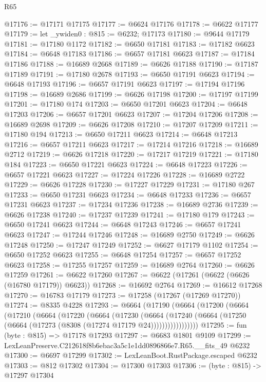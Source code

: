 \begin{lexlean}{R65}
\begin{coremodule}
{@17176 := @17171 @17175
@17177 := @6624 @17176
@17178 := @6622 @17177
@17179 := let _ywiden0 : @815 := @6232; @17173
@17180 := @9644 @17179
@17181 := @17180 @1172
@17182 := @6650 @17181
@17183 := @17182 @6623
@17184 := @6648 @17183
@17186 := @6657 @17181 @6623
@17187 := @17184 @17186
@17188 := @16689 @2668
@17189 := @6626 @17188
@17190 := @17187 @17189
@17191 := @17180 @2678
@17193 := @6650 @17191 @6623
@17194 := @6648 @17193
@17196 := @6657 @17191 @6623
@17197 := @17194 @17196
@17198 := @16689 @2686
@17199 := @6626 @17198
@17200 := @17197 @17199
@17201 := @17180 @174
@17203 := @6650 @17201 @6623
@17204 := @6648 @17203
@17206 := @6657 @17201 @6623
@17207 := @17204 @17206
@17208 := @16689 @2698
@17209 := @6626 @17208
@17210 := @17207 @17209
@17211 := @17180 @194
@17213 := @6650 @17211 @6623
@17214 := @6648 @17213
@17216 := @6657 @17211 @6623
@17217 := @17214 @17216
@17218 := @16689 @2712
@17219 := @6626 @17218
@17220 := @17217 @17219
@17221 := @17180 @184
@17223 := @6650 @17221 @6623
@17224 := @6648 @17223
@17226 := @6657 @17221 @6623
@17227 := @17224 @17226
@17228 := @16689 @2722
@17229 := @6626 @17228
@17230 := @17227 @17229
@17231 := @17180 @267
@17233 := @6650 @17231 @6623
@17234 := @6648 @17233
@17236 := @6657 @17231 @6623
@17237 := @17234 @17236
@17238 := @16689 @2736
@17239 := @6626 @17238
@17240 := @17237 @17239
@17241 := @17180 @179
@17243 := @6650 @17241 @6623
@17244 := @6648 @17243
@17246 := @6657 @17241 @6623
@17247 := @17244 @17246
@17248 := @16689 @2750
@17249 := @6626 @17248
@17250 := @17247 @17249
@17252 := @6627 @17179 @1102
@17254 := @6650 @17252 @6623
@17255 := @6648 @17254
@17257 := @6657 @17252 @6623
@17258 := @17255 @17257
@17259 := @16689 @2764
@17260 := @6626 @17259
@17261 := @6622 @17260
@17267 := @6622 (@17261 (@6622 (@6626 (@16780 @17179)) @6623))
@17268 := @16692 @2764
@17269 := @16612 @17268
@17270 := @16783 @17179
@17273 := @17258 (@17267 (@17269 @17270))
@17274 := @8335 @4228
@17293 := @6664
    (@17190
      (@6664
        (@17200
          (@6664
            (@17210
              (@6664
                (@17220
                  (@6664
                    (@17230
                      (@6664
                        (@17240
                          (@6664 (@17250 (@6664 (@17273 (@8308 (@17274 @17179 @24)))))))))))))))))
@17295 := fun (byte : @815) => @17178 @17293
@17297 := @6683 @1801 @9109
@17299 := LexLeanPreserve.C212618f8b6ebac3a5c1e1dd0896866e7.R65.__fits_49 @6232
@17300 := @6697 @17299
@17302 := LexLeanBoot.RustPackage.escaped @6232
@17303 := @812 @17302
@17304 := @17300 @17303
@17306 := (byte : @815) -> @17297 @17304
}
\end{coremodule}
\end{lexlean}
